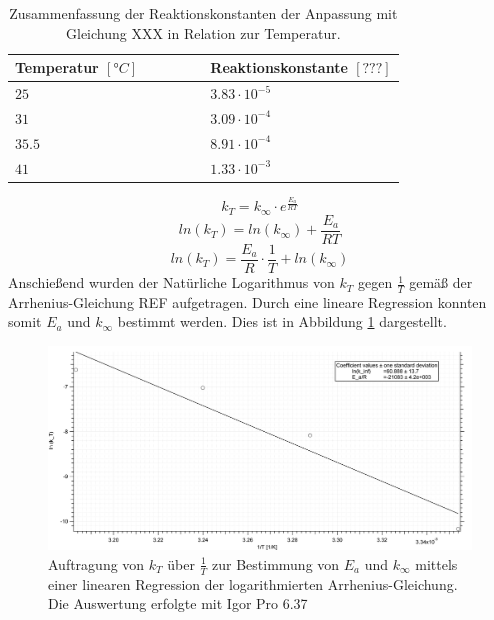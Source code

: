 \begin{table}[H]

 
 
 \caption{Zusammenfassung der Reaktionskonstanten der Anpassung mit Gleichung XXX in Relation zur Temperatur.}
\begin{tabular}{L{0.5\linewidth}L{0.5\linewidth}}
Temperatur $[°C]$ & Reaktionskonstante $[???]$  \\
\hline \addlinespace[1ex] 
$25$ & $3.83\cdot 10^{-5}$ \\
$31$ & $3.09\cdot 10^{-4}$ \\
$35.5$ & $8.91\cdot 10^{-4}$ \\
$41$ & $1.33\cdot 10^{-3}$ \\
 \end{tabular}
 \label{tab1}
 \end{table}
\begin{equation}
k_T = k_\infty \cdot e^{\frac{E_a}{RT}}
\end{equation}
\begin{equation}
ln(k_T) = ln(k_\infty) + \frac{E_a}{RT}
\end{equation}
\begin{equation}
ln(k_T) = \frac{E_a}{R} \cdot \frac{1}{T} + ln(k_\infty) 
\end{equation}
Anschießend wurden der Natürliche Logarithmus von $k_T$ gegen $\frac{1}{T}$ gemäß der Arrhenius-Gleichung REF aufgetragen. Durch eine lineare Regression konnten somit $E_a$ und $k_\infty$ bestimmt werden. Dies ist in Abbildung \ref{ln} dargestellt.
\begin{figure}[h]
	\centering	
	\begin{minipage}{1\textwidth}
	\includegraphics[width=\columnwidth]{Bilder/Graph2.png}
	\end{minipage}	
	\caption{Auftragung von $k_T$ über $\frac{1}{T}$ zur Bestimmung von $E_a$ und $k_\infty$ mittels einer linearen Regression der logarithmierten Arrhenius-Gleichung. Die Auswertung erfolgte mit Igor Pro 6.37}
	\label{ln}
\end{figure}

